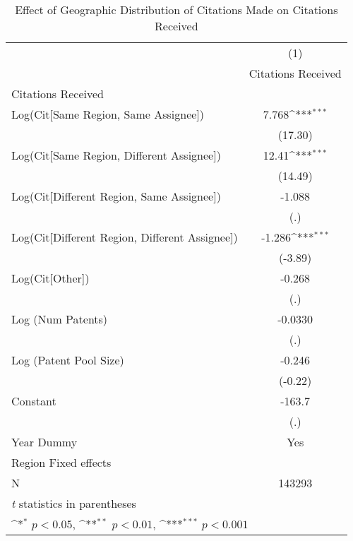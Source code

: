 {
\def\sym#1{\ifmmode^{#1}\else\(^{#1}\)\fi}
\begin{longtable}{l*{1}{c}}
\caption{Effect of Geographic Distribution of Citations Made on Citations Received \label{eflowsreg}}\\
\hline\hline\endfirsthead\hline\endhead\hline\endfoot\endlastfoot
                    &\multicolumn{1}{c}{(1)}\\
                    &\multicolumn{1}{c}{Citations Received}\\
\hline
Citations Received  &                     \\
Log(Cit[Same Region, Same Assignee])&       7.768\sym{***}\\
                    &     (17.30)         \\
[1em]
Log(Cit[Same Region, Different Assignee])&       12.41\sym{***}\\
                    &     (14.49)         \\
[1em]
Log(Cit[Different Region, Same Assignee])&      -1.088         \\
                    &         (.)         \\
[1em]
Log(Cit[Different Region, Different Assignee])&      -1.286\sym{***}\\
                    &     (-3.89)         \\
[1em]
Log(Cit[Other])     &      -0.268         \\
                    &         (.)         \\
[1em]
Log (Num Patents)   &     -0.0330         \\
                    &         (.)         \\
[1em]
Log (Patent Pool Size)&      -0.246         \\
                    &     (-0.22)         \\
[1em]
Constant            &      -163.7         \\
                    &         (.)         \\
[1em]
Year Dummy          &         Yes         \\
\hline
Region Fixed effects&                     \\
N                   &      143293         \\
\hline\hline
\multicolumn{2}{l}{\footnotesize \textit{t} statistics in parentheses}\\
\multicolumn{2}{l}{\footnotesize \sym{*} \(p<0.05\), \sym{**} \(p<0.01\), \sym{***} \(p<0.001\)}\\
\end{longtable}
}
